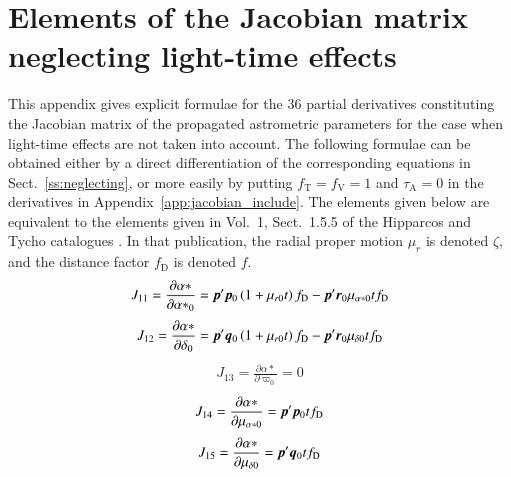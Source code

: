 \documentclass{aa}
\def\vec#1{\ensuremath{\mathchoice{\mbox{\boldmath$\displaystyle#1$}}
{\mbox{\boldmath$\textstyle#1$}}
{\mbox{\boldmath$\scriptstyle#1$}}
{\mbox{\boldmath$\scriptscriptstyle#1$}}}}
\begin{document}
\section{Elements of the Jacobian matrix neglecting light-time effects}\label{app:Jacobian_neglect}

This appendix gives explicit formulae for the 36 partial derivatives constituting the Jacobian matrix
of the propagated astrometric parameters for the case when
light-time effects are not taken into account. The following formulae can be obtained either by a direct
differentiation of the corresponding equations in Sect.~\ref{ss:neglecting}, or more easily by putting
$f_\mathrm{T}=f_\mathrm{V}=1$ and $\tau_\mathrm{A}=0$ in the derivatives in
Appendix~\ref{app:jacobian_include}. The elements given below are equivalent to the elements
given in Vol.~1, Sect.~1.5.5 of the Hipparcos and Tycho catalogues \citep{esa1997}. In that
publication, the radial proper motion $\mu_r$ is denoted $\zeta$, and the distance factor
$f_\mathrm{D}$ is denoted $f$.
\begin{equation*}
 \begin{aligned}
    J_{11}=\frac{\partial\alpha*}{\partial{\alpha*}_0}=
    \vec{p}'\vec{p}_0\left(1+\mu_{r0}t\right)f_\mathrm{D}
    -\vec{p}'\vec{r}_0\mu_{\alpha*0}tf_\mathrm{D}
 \end{aligned}
\end{equation*}
\begin{equation*}
 \begin{aligned}
    J_{12}=\frac{\partial\alpha*}{\partial\delta_0}=
    \vec{p}'\vec{q}_0\left(1+\mu_{r0}t\right)f_\mathrm{D}
    -\vec{p}'\vec{r}_0\mu_{\delta0}tf_\mathrm{D}
 \end{aligned}
\end{equation*}
\begin{equation*}
 \begin{aligned}
    J_{13}=\frac{\partial\alpha*}{\partial\varpi_0}=0
 \end{aligned}
\end{equation*}
\begin{equation*}
 \begin{aligned}
    J_{14}=\frac{\partial\alpha*}{\partial\mu_{\alpha*0}}=
    \vec{p}'\vec{p}_0tf_\mathrm{D}
 \end{aligned}
\end{equation*}
\begin{equation*}
 \begin{aligned}
    J_{15}=\frac{\partial\alpha*}{\partial\mu_{\delta0}}=
    \vec{p}'\vec{q}_0tf_\mathrm{D}
 \end{aligned}
\end{equation*}
\end{document}
